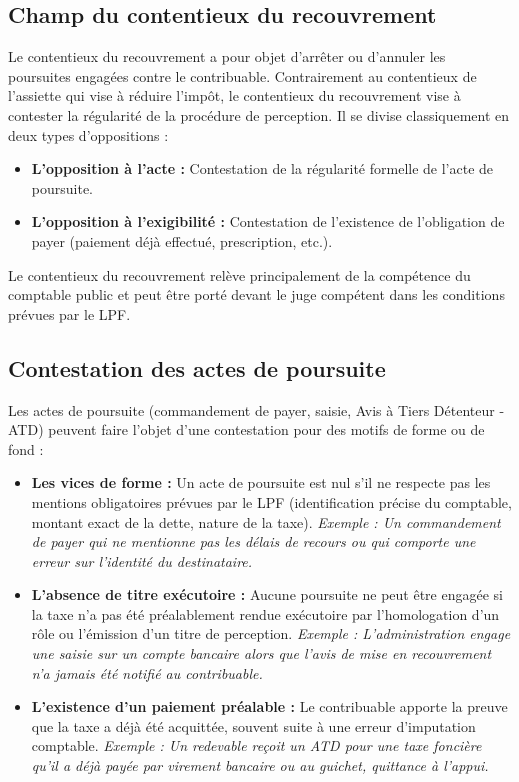 \documentclass[Cours_contentieuxTF2026.tex]{subfiles}
\begin{document}
\subsection{Champ du contentieux du recouvrement}

Le contentieux du recouvrement a pour objet d'arrêter ou d'annuler les poursuites engagées contre le contribuable. Contrairement au contentieux de l'assiette qui vise à réduire l'impôt, le contentieux du recouvrement vise à contester la régularité de la procédure de perception. 
Il se divise classiquement en deux types d'oppositions :
\begin{itemize}[label=\tiny$\blacksquare$]
	\item \textbf{L'opposition à l'acte :} Contestation de la régularité formelle de l'acte de poursuite.
	\item \textbf{L'opposition à l'exigibilité :} Contestation de l'existence de l'obligation de payer (paiement déjà effectué, prescription, etc.).
\end{itemize}

Le contentieux du recouvrement relève principalement de la compétence du comptable public et peut être porté
devant le juge compétent dans les conditions prévues par le LPF.

\subsection{Contestation des actes de poursuite}
Les actes de poursuite (commandement de payer, saisie, Avis à Tiers Détenteur - ATD) peuvent faire l'objet d'une contestation pour des motifs de forme ou de fond :

\begin{itemize}
	\item \textbf{Les vices de forme :} Un acte de poursuite est nul s'il ne respecte pas les mentions obligatoires prévues par le LPF (identification précise du comptable, montant exact de la dette, nature de la taxe).
	\textit{Exemple : Un commandement de payer qui ne mentionne pas les délais de recours ou qui comporte une erreur sur l'identité du destinataire.}
	
	\item \textbf{L'absence de titre exécutoire :} Aucune poursuite ne peut être engagée si la taxe n'a pas été préalablement rendue exécutoire par l'homologation d'un rôle ou l'émission d'un titre de perception.
	\textit{Exemple : L'administration engage une saisie sur un compte bancaire alors que l'avis de mise en recouvrement n'a jamais été notifié au contribuable.}
	
	\item \textbf{L'existence d'un paiement préalable :} Le contribuable apporte la preuve que la taxe a déjà été acquittée, souvent suite à une erreur d'imputation comptable.
	\textit{Exemple : Un redevable reçoit un ATD pour une taxe foncière qu'il a déjà payée par virement bancaire ou au guichet, quittance à l'appui.}
\end{itemize}
\end{document}
